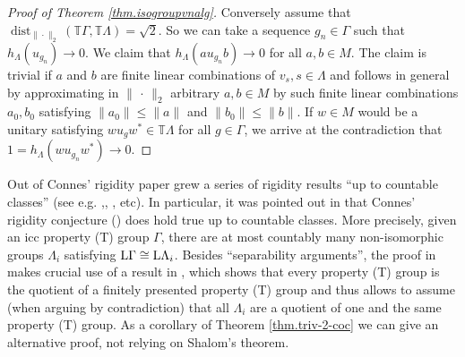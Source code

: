 \documentclass[a4paper,11pt]{amsart}
\numberwithin{equation}{section}
\begin{document}
\begin{proof}[Proof of Theorem \ref{thm.isogroupvnalg}]
Conversely assume that ${\operatorname{dist}_{\|\cdot\|_2}}({\mathbb{T}} \Gamma,{\mathbb{T}} \Lambda) = \sqrt{2}$. So we can take a sequence $g_n \in \Gamma$ such that $h_\Lambda(u_{g_n}) {\rightarrow} 0$. We claim that $h_\Lambda(a u_{g_n} b) {\rightarrow} 0$ for all $a,b \in M$. The claim is trivial if $a$ and $b$ are finite linear combinations of $v_s, s \in \Lambda$ and follows in general by approximating in $\| \, \cdot \,\|_2$ arbitrary $a,b \in M$ by such finite linear combinations $a_0,b_0$ satisfying $\|a_0\| {\leqslant} \|a\|$ and $\|b_0\| {\leqslant} \|b\|$. If $w \in M$ would be a unitary satisfying $w u_g w^* \in {\mathbb{T}} \Lambda$ for all $g \in \Gamma$, we arrive at the contradiction that
$1 = h_\Lambda(w u_{g_n} w^*) {\rightarrow} 0$.
\end{proof}

Out of Connes' rigidity paper \cite{Co80a} grew a series of rigidity
results ``up to countable classes'' (see e.g. \cite[Theorem
5.3(2)]{Po01a},\cite[Theorem 4.4]{Po01b}, \cite[Theorem 2]{Oz02},
etc). In particular, it was pointed out in \cite[Section 4]{Po06b}
that Connes' rigidity conjecture (\cite{Co80b}) does hold true up to
countable classes. More precisely, given an icc property (T) group
$\Gamma$, there are at most countably many non-isomorphic groups
$\Lambda_i$ satisfying ${\mathord{\text{\rm L}}} \Gamma \cong {\mathord{\text{\rm L}}} \Lambda_i$. Besides ``separability arguments'', the proof in \cite{Po06b} makes crucial
use of a result in \cite[Theorem, p.\ 5]{Sh00}, which shows that
every property (T) group is the quotient of a finitely presented
property (T) group and thus allows to assume (when arguing by
contradiction) that all $\Lambda_i$ are a quotient of one and the
same property (T) group. As a corollary of Theorem
\ref{thm.triv-2-coc} we can give an alternative proof, not relying
on Shalom's theorem.
\end{document}
